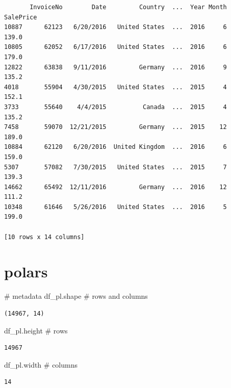 \documentclass[
  letterpaper,
  DIV=11,
  numbers=noendperiod]{scrreprt}
\newenvironment{Shaded}{\begin{snugshade}}{\end{snugshade}}
\newcommand{\CommentTok}[1]{\textcolor[rgb]{0.37,0.37,0.37}{#1}}
\newcommand{\NormalTok}[1]{\textcolor[rgb]{0.00,0.23,0.31}{#1}}
\begin{document}
\begin{verbatim}
       InvoiceNo        Date         Country  ...  Year Month SalePrice
10887      62123   6/20/2016   United States  ...  2016     6     139.0
10805      62052   6/17/2016   United States  ...  2016     6     179.0
12822      63838   9/11/2016         Germany  ...  2016     9     135.2
4018       55904   4/30/2015   United States  ...  2015     4     152.1
3733       55640    4/4/2015          Canada  ...  2015     4     135.2
7458       59070  12/21/2015         Germany  ...  2015    12     189.0
10884      62120   6/20/2016  United Kingdom  ...  2016     6     159.0
5307       57082   7/30/2015   United States  ...  2015     7     139.3
14662      65492  12/11/2016         Germany  ...  2016    12     111.2
10348      61646   5/26/2016   United States  ...  2016     5     199.0

[10 rows x 14 columns]
\end{verbatim}

\section{polars}

\begin{Shaded}
\begin{Highlighting}[]
\CommentTok{\# metadata}
\NormalTok{df\_pl.shape }\CommentTok{\# rows and columns}
\end{Highlighting}
\end{Shaded}

\begin{verbatim}
(14967, 14)
\end{verbatim}

\begin{Shaded}
\begin{Highlighting}[]
\NormalTok{df\_pl.height }\CommentTok{\# rows}
\end{Highlighting}
\end{Shaded}

\begin{verbatim}
14967
\end{verbatim}

\begin{Shaded}
\begin{Highlighting}[]
\NormalTok{df\_pl.width }\CommentTok{\# columns }
\end{Highlighting}
\end{Shaded}

\begin{verbatim}
14
\end{verbatim}
\end{document}
